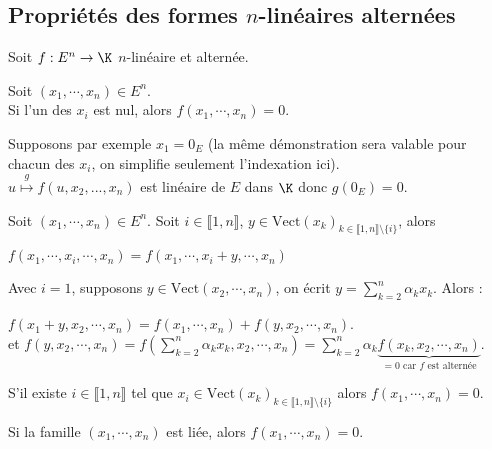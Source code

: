 \documentclass[12pt,a4paper]{report}
\begin{document}
\subsection{Propriétés des formes $n$-linéaires alternées}

Soit $f : E^n \to \K$ $n$-linéaire et alternée.

\begin{proposition}{}{}
Soit $(x_1,\cdots,x_n) \in E^n$. \\
Si l'un des $x_i$ est nul, alors $f(x_1,\cdots,x_n)=0$.
\end{proposition}

\begin{demo}{}
Supposons par exemple $x_1 = 0_E$ (la même démonstration sera valable pour chacun des $x_i$, on simplifie seulement l'indexation ici). \\
$u \overset{g}{\mapsto} f(u,x_2,...,x_n)$ est linéaire de $E$ dans $\K$ donc $g(0_E) = 0$.
\end{demo}

\begin{proposition}{}{}
Soit $(x_1,\cdots,x_n) \in E^n$. Soit $i \in \llbracket 1,n \rrbracket$, $y \in \text{Vect}(x_k)_{k \in \llbracket 1,n \rrbracket \setminus \{i\}}$, alors
\begin{center}
$f(x_1,\cdots,x_i,\cdots,x_n)=f(x_1,\cdots,x_i+y,\cdots,x_n)$
\end{center}
\end{proposition}

\begin{demo}{}
Avec $i = 1$, supposons $y \in \text{Vect}(x_2,\cdots,x_n)$, on écrit $y = \displaystyle{\sum_{k=2}^n \alpha_kx_k}$. Alors :
\begin{center}
	$f(x_1+y,x_2,\cdots,x_n) = f(x_1,\cdots,x_n)+f(y,x_2,\cdots,x_n)$. \\
	et $f(y,x_2,\cdots, x_n) = f\left(\displaystyle{\sum_{k=2}^n \alpha_kx_k, x_2,\cdots,x_n}\right) = \displaystyle{\sum_{k=2}^n \alpha_k\underbrace{f(x_k,x_2,\cdots,x_n)}_{=0 \text{ car }f \text{ est alternée}}}$.
\end{center}
\end{demo}

\begin{remarque}[Variante]{}
S'il existe $i \in \llbracket 1,n \rrbracket$ tel que $x_i \in \text{Vect}(x_k)_{k \in \llbracket 1,n \rrbracket \setminus \{i\}}$ alors $f(x_1,\cdots,x_n) = 0$.
\end{remarque}

\begin{corollaire}{}{}
Si la famille $(x_1,\cdots,x_n)$ est liée, alors $f(x_1,\cdots,x_n) = 0$.
\end{corollaire}
\end{document}
